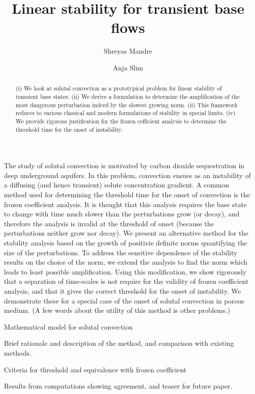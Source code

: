 \documentclass[letterpaper,10pt,prl,twocolumn,aps]{revtex4-1}
\begin{document}
\title{Linear stability for transient base flows}
\author{Shreyas Mandre}
\author{Anja Slim}
\begin{abstract}
(i) We look at solutal convection as a prototypical problem for linear stability of transient base states. (ii) We derive a formulation to determine the amplification of the most dangerous perturbation indced by the slowest growing norm. (ii) This framework reduces to various classical and modern formulations of stability in special limits. (iv) We provide rigorous justification for the frozen cefficient analysis to determine the threshold time for the onset of instability.
\end{abstract}
\maketitle
The study of solutal convection is motivated by carbon dioxide sequestration in deep underground aquifers\cite{SlimRama10}. In this problem, convection ensues as an instability of a diffusing (and hence transient) solute concentration gradient. A common method used for determining the threshold time for the onset of convection is the frozen coefficient analysis. It is thought that this analysis requires the base state to change with time much slower than the perturbations grow (or decay), and therefore the analysis is invalid at the threshold of onset (because the perturbations neither grow nor decay). We present an alternative method for the stability analysis based on the growth of positivie definite norms quantifying the size of the perturbations. To address the sensitive dependence of the stability results on the choice of the norm, we extend the analysis to find the norm which leads to least possible amplification. Using this modification, we show rigorously that a separation of time-scales is not require for the validity of frozen coefficient analysis, and that it gives the correct threshold for the onset of instability. We demonstrate these for a special case of the onset of solutal convection in porous medium. (A few words about the utility of this method is other problems.)

Mathematical model for solutal convection

Brief rationale and description of the method, and comparison with existing methods.

Criteria for threshold and equivalence with frozen coefficient

Results from computations showing agreement, and teaser for future paper.


% 
\end{document}
